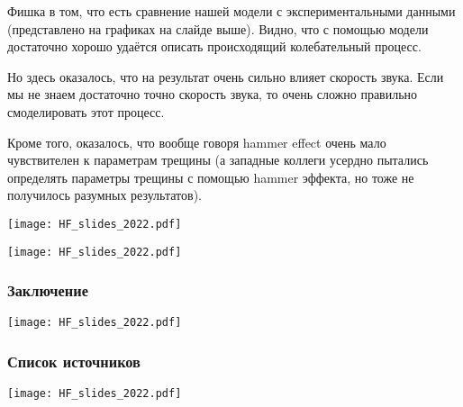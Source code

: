 \documentclass[main.tex]{subfiles}
\begin{document}
Фишка в том, что есть сравнение нашей модели с экспериментальными данными (представлено на графиках на слайде выше).
Видно, что с помощью модели достаточно хорошо удаётся описать происходящий колебательный процесс.

Но здесь оказалось, что на результат очень сильно влияет скорость звука.
Если мы не знаем достаточно точно скорость звука, то очень сложно правильно смоделировать этот процесс.

Кроме того, оказалось, что вообще говоря hammer effect очень мало чувствителен к параметрам трещины (а западные коллеги усердно пытались определять параметры трещины с помощью hammer эффекта, но тоже не получилось разумных результатов).

\texttt{[image: HF\_slides\_2022.pdf]}

\texttt{[image: HF\_slides\_2022.pdf]}

\subsubsection{Заключение}

\texttt{[image: HF\_slides\_2022.pdf]}

\subsubsection{Список источников}

\texttt{[image: HF\_slides\_2022.pdf]}
\end{document}
